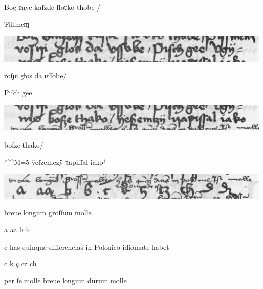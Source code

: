 \splitverse

Boç ʋnye kaſzde ſƚoʋko thobe /

\indentVerse Ƥiſſmeɱ 

\includegraphics[width=\hsize]{wierszP23}

\splitverse

roſɲi gƚos da ʋſſobe/

\indentVerse Piſch gee 

\includegraphics[width=\hsize]{wierszP24}

\splitverse

 boſze thako/

\catcode `\^^M=5
\obeylines
\indentVerse ÿeſzemczÿ ɲapiſſaƚ iako¹




\newpage

\fulllines

\includegraphics[width=\hsize]{wierszP25-26}


breue longum groſſum molle



a aa ƀ ɓ

c has quinque differencias in Polonico idiomate habet

c k ç cz ch

per ſe molle breue longum durum molle

